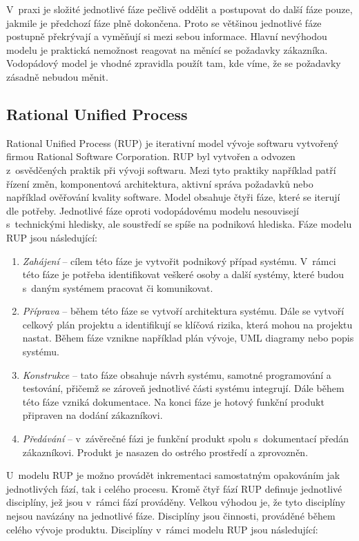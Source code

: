 \documentclass[czech,master]{diploma}
\begin{document}
V~praxi je složité jednotlivé fáze pečlivě oddělit a postupovat do další fáze pouze, jakmile je předchozí fáze plně dokončena. Proto se většinou jednotlivé fáze postupně překrývají a vyměňují si mezi sebou informace. Hlavní nevýhodou modelu je praktická nemožnost reagovat na měnící se požadavky zákazníka. Vodopádový model je vhodné zpravidla použít tam, kde víme, že se požadavky zásadně nebudou měnit.

\subsection{Rational Unified Process}
Rational Unified Process (RUP) je iterativní model vývoje softwaru vytvořený firmou Rational Software Corporation. RUP byl vytvořen a odvozen z~osvědčených praktik při vývoji softwaru. Mezi tyto praktiky například patří řízení změn, komponentová architektura, aktivní správa požadavků nebo například ověřování kvality software. Model obsahuje čtyři fáze, které se iterují dle potřeby. Jednotlivé fáze oproti vodopádovému modelu nesouvisejí s~technickými hledisky, ale soustředí se spíše na podniková hlediska. \cite{ref:rup_ibm_about} Fáze modelu RUP jsou následující:

\begin{enumerate}
\item \textit{Zahájení} -- cílem této fáze je vytvořit podnikový případ systému. V~rámci této fáze je potřeba identifikovat veškeré osoby a další systémy, které budou s~daným systémem pracovat či komunikovat.
\item \textit{Příprava} -- během této fáze se vytvoří architektura systému. Dále se vytvoří celkový plán projektu a identifikují se klíčová rizika, která mohou na projektu nastat. Během fáze vznikne například plán vývoje, UML diagramy nebo popis systému.
\item \textit{Konstrukce} -- tato fáze obsahuje návrh systému, samotné programování a testování, přičemž se zároveň jednotlivé části systému integrují. Dále během této fáze vzniká dokumentace. Na konci fáze je hotový funkční produkt připraven na dodání zákazníkovi.
\item \textit{Předávání} -- v~závěrečné fázi je funkční produkt spolu s~dokumentací předán zákazníkovi. Produkt je nasazen do ostrého prostředí a zprovozněn.
\end{enumerate}

U~modelu RUP je možno provádět inkrementaci samostatným opakováním jak jednotlivých fází, tak i celého procesu. Kromě čtyř fází RUP definuje jednotlivé disciplíny, jež jsou v~rámci fází prováděny. Velkou výhodou je, že tyto disciplíny nejsou navázány na jednotlivé fáze. Disciplíny jsou činnosti, prováděné během celého vývoje produktu. Disciplíny v~rámci modelu RUP jsou následující:
\end{document}
